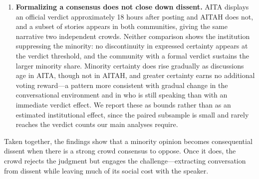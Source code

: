 \begin{enumerate}
    \item \textbf{Formalizing a consensus does not close down dissent.} AITA displays an official verdict approximately 18 hours after posting and AITAH does not, and a subset of stories appears in both communities, giving the same narrative two independent crowds. Neither comparison shows the institution suppressing the minority: no discontinuity in expressed certainty appears at the verdict threshold, and the community with a formal verdict sustains the larger minority share. Minority certainty does rise gradually as discussions age in AITA, though not in AITAH, and greater certainty earns no additional voting reward—a pattern more consistent with gradual change in the conversational environment and in who is still speaking than with an immediate verdict effect. We report these as bounds rather than as an estimated institutional effect, since the paired subsample is small and rarely reaches the verdict counts our main analyses require.
\end{enumerate}

Taken together, the findings show that a minority opinion becomes consequential dissent when there is a strong crowd consensus to oppose. Once it does, the crowd rejects the judgment but engages the challenge—extracting conversation from dissent while leaving much of its social cost with the speaker.
